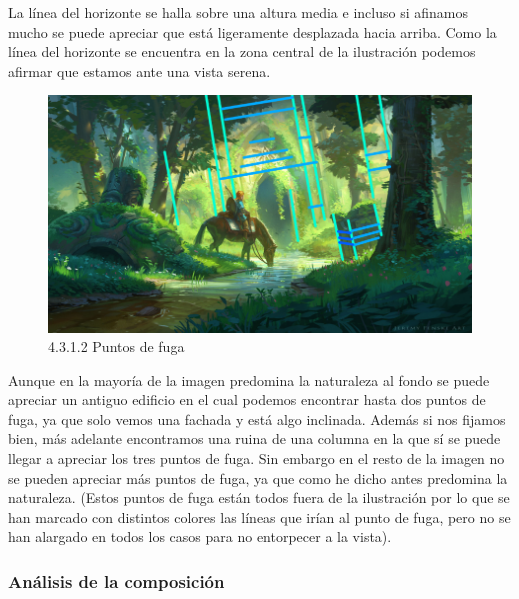 \documentclass[12pt]{article}
\begin{document}
    La línea del horizonte se halla sobre una altura media e incluso si afinamos mucho se puede apreciar que está ligeramente desplazada hacia arriba. Como la línea del horizonte se encuentra en la zona central de la ilustración podemos afirmar que estamos ante una vista serena.

    \begin{figure}[H]
      \centering
      \includegraphics[width=\textwidth]{images/Saúl/Sección 3/EA_img3_1Perspectiva_2PuntosFuga.png}
      \caption{\small 4.3.1.2 Puntos de fuga}
    \end{figure}

    Aunque en la mayoría de la imagen predomina la naturaleza al fondo se puede apreciar un antiguo edificio en el cual podemos encontrar hasta dos puntos de fuga, ya que solo vemos una fachada y está algo inclinada. Además si nos fijamos bien, más adelante encontramos una ruina de una columna en la que sí se puede llegar a apreciar los tres puntos de fuga. Sin embargo en el resto de la imagen no se pueden apreciar más puntos de fuga, ya que como he dicho antes predomina la naturaleza.
(Estos puntos de fuga están todos fuera de la ilustración por lo que se han marcado con distintos colores las líneas que irían al punto de fuga, pero no se han alargado en todos los casos para no entorpecer a la vista).


        \subsubsection{Análisis de la composición}
\end{document}
